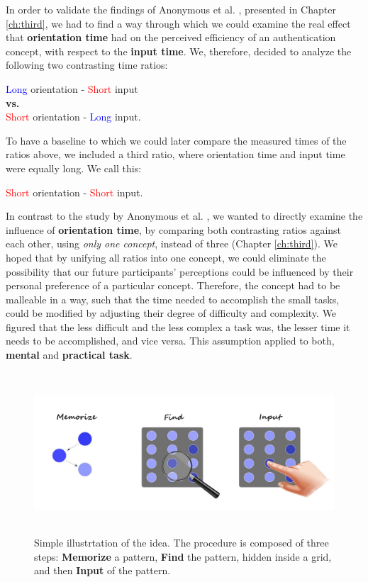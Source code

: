 In order to validate the findings of Anonymous et al. \cite{anonymous}, presented in Chapter \ref{ch:third}, we had to find a way through which we could examine the real effect that \textbf{orientation time} had on the perceived efficiency of an authentication concept, with respect to the \textbf{input time}. We, therefore, decided to analyze the following two contrasting time ratios:  
\begin{center}
    \textcolor{blue}{Long} orientation - \textcolor{red}{Short} input \\
    \textbf{vs.} \\
    \textcolor{red}{Short} orientation - \textcolor{blue}{Long} input.
\end{center} 

To have a baseline to which we could later compare the measured times of the ratios above, we included a third ratio, where orientation time and input time were equally long. We call this:  
\begin{center}
\textcolor{red}{Short} orientation - \textcolor{red}{Short} input.
\end{center} 

In contrast to the study by Anonymous et al. \cite{anonymous}, we wanted to directly examine the influence of \textbf{orientation time}, by comparing both contrasting ratios against each other, using \textit{only one concept}, instead of three (Chapter \ref{ch:third}). We hoped that by unifying all ratios into one concept, we could eliminate the possibility that our future participants' perceptions could be influenced by their personal preference of a particular concept. Therefore, the concept had to be malleable in a way, such that the time needed to accomplish the small tasks, could be modified by adjusting their degree of difficulty and complexity. We figured that the less difficult and the less complex a task was, the lesser time it needs to be accomplished, and vice versa. This assumption applied to both, \textbf{mental} and \textbf{practical task}.

\begin{figure}[t!]
\centering
\includegraphics[width=15cm, height=6cm]{Chapters/graphics/ConceptIdea.jpeg}
\caption{Simple illustrtation of the idea. The procedure is composed of three steps: \textbf{Memorize} a pattern, \textbf{Find} the pattern, hidden inside a grid, and then \textbf{Input} of the pattern.}
\label{fig:concept}
\end{figure}

